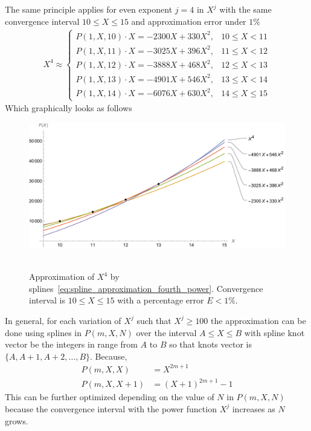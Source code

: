 The same principle applies for even exponent $j=4$ in $X^j$ with the same convergence interval $10 \leq X \leq 15$
and approximation error under $1\%$
\begin{align}
    X^4 \approx
    \begin{cases}
        P(1,X,10) \cdot X = -2300X + 330X^2, & 10 \leq X < 11 \\
        P(1,X,11) \cdot X = -3025X + 396X^2, & 11 \leq X < 12 \\
        P(1,X,12) \cdot X = -3888X + 468X^2, & 12 \leq X < 13 \\
        P(1,X,13) \cdot X = -4901X + 546X^2, & 13 \leq X < 14 \\
        P(1,X,14) \cdot X = -6076X + 630X^2, & 14 \leq X \leq 15
    \end{cases}
    \label{eq:spline_approximation_fourth_power}
\end{align}
Which graphically looks as follows
\begin{figure}[H]
    \centering
    \includegraphics[width=1\textwidth]{sections/images/09_plots_of_fourth_power_with_p_2_10_15_times_x}
    ~\caption{
        Approximation of $X^4$ by splines~\eqref{eq:spline_approximation_fourth_power}.
        Convergence interval is $10 \leq X \leq 15$ with a percentage error $E < 1\%$.
    }
    \label{fig:09_plots_of_fourth_power_with_p_2_10_15_times_x}
\end{figure}
In general, for each variation of $X^j$ such that $X^j \geq 100$ the approximation can be done using
splines in $P(m,X, N)$ over the interval $A \leq X \leq B$ with spline knot vector be the integers in
range from $A$ to $B$ so that knots vector is $\{A, A+1, A+2, \ldots, B \}$.
Because,
\begin{align*}
    P(m,X, X) &= X^{2m+1} \\
    P(m,X, X+1) &= (X+1)^{2m+1} - 1
\end{align*}
This can be further optimized depending on the value of $N$ in $P(m,X,N)$ because the convergence interval
with the power function $X^j$ increases as $N$ grows.
